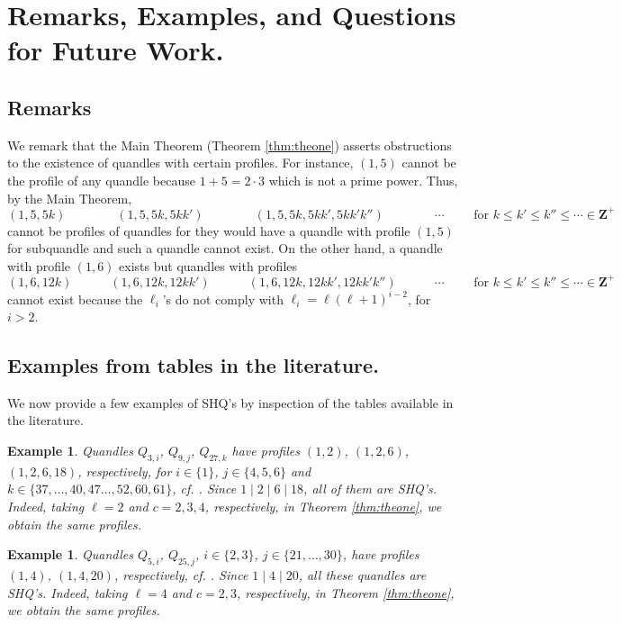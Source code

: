 \documentclass{article}
\newtheorem{example}[theorem]{Example}
\begin{document}
\section{Remarks, Examples, and Questions for Future Work.}\label{sctn:final}


\subsection{Remarks}\label{subsctn:rem}

We remark that the Main Theorem (Theorem \ref{thm:theone}) asserts  obstructions to the existence of quandles with certain profiles. For instance, $(1, 5)$ cannot be the profile of any quandle because $1+5=2\cdot 3$ which is not a prime power. Thus, by the Main Theorem, $$(1, 5, 5k)  \qquad \qquad (1, 5, 5k, 5kk')  \qquad \qquad (1, 5, 5k, 5kk', 5kk'k'')\qquad \qquad \cdots \qquad  \text{ for }k\leq k'\leq k''\leq \cdots \in \mathbf{Z}^+ $$ cannot be profiles of quandles for they would have a quandle with profile $(1, 5)$ for subquandle and such a quandle cannot exist. On the other hand, a quandle with profile $(1, 6)$ exists but quandles with profiles $$(1, 6, 12k)  \qquad \quad (1, 6, 12k, 12kk')  \qquad \quad (1, 6, 12k, 12kk', 12kk'k'') \qquad \quad \cdots \qquad  \text{ for }k\leq k'\leq k''\leq \cdots \in \mathbf{Z}^+ $$ cannot exist because the $\ell_i$'s do not comply with $\ell_i=\ell(\ell+1)^{i-2}$, for $i>2$.



\bigbreak



\subsection{Examples from tables in the literature.}\label{subsctn:examples}


We now provide a few examples of SHQ's by inspection of the tables available in the literature.

\begin{example}
Quandles $Q_{3,i}$, $Q_{9,j}$, $Q_{27,k}$ have profiles $(1,2)$, $(1,2,6)$, $(1,2,6,18)$, respectively, for $i\in\{1\}$, $j\in\{4,5,6\}$ and $k\in\{37,\dots,40,47\dots,52,60,61\}$, cf. \cite{Lages_Lopes_Vojtěchovský}. Since $1\mid2\mid6\mid18$, all of them are SHQ's. Indeed, taking $\ell=2$ and $c=2,3,4$, respectively, in Theorem \ref{thm:theone}, we obtain the same profiles.
\end{example}

\begin{example}
Quandles $Q_{5,i}$, $Q_{25,j}$, $i\in\{2,3\}$, $j\in\{21,\dots,30\}$, have profiles $(1,4)$, $(1,4,20)$, respectively, cf. \cite{Lages_Lopes_Vojtěchovský}. Since $1\mid4\mid20$, all these quandles are SHQ's. Indeed, taking $\ell=4$ and $c=2,3$, respectively, in Theorem \ref{thm:theone}, we obtain the same profiles.
\end{example}
\end{document}
